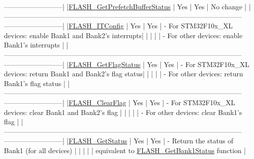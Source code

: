 \begin{DoxyCode}
      --------------------------|
  |\hyperlink{group___f_l_a_s_h___exported___functions_ga289bffe7f078d6a130222f03c59bc235}{FLASH\_GetPrefetchBufferStatus}       |    Yes     |      Yes      | No 
      change                                                      |
  |--------------------------------------------------------------------------------------------------------
      --------------------------|
  |\hyperlink{group___f_l_a_s_h___exported___functions_ga94c1e51a9c3bf8d48eb6eb4a4d054861}{FLASH\_ITConfig}                      |    Yes     |      Yes      | - For STM32F10x\_XL 
      devices: enable Bank1 and Bank2\textcolor{stringliteral}{'s interrupts|}
\textcolor{stringliteral}{  |                                    |            |               | - For other devices: enable Bank1'}s 
      interrupts                 |
  |--------------------------------------------------------------------------------------------------------
      --------------------------|
  |\hyperlink{group___f_l_a_s_h___exported___functions_gae3fb545e32f21501ca27d4380e0f2088}{FLASH\_GetFlagStatus}                 |    Yes     |      Yes      | - For STM32F10x\_XL
       devices: \textcolor{keywordflow}{return} Bank1 and Bank2\textcolor{stringliteral}{'s flag status|}
\textcolor{stringliteral}{  |                                    |            |               | - For other devices: return Bank1'}s 
      flag status                |
  |--------------------------------------------------------------------------------------------------------
      --------------------------|
  |\hyperlink{group___f_l_a_s_h___exported___functions_gac4be1d486483fa5cd70ec77d44ca8f87}{FLASH\_ClearFlag}                     |    Yes     |      Yes      | - For STM32F10x\_XL 
      devices: clear Bank1 and Bank2\textcolor{stringliteral}{'s flag       |}
\textcolor{stringliteral}{  |                                    |            |               | - For other devices: clear Bank1'}s 
      flag                        |
  |--------------------------------------------------------------------------------------------------------
      --------------------------|
  |\hyperlink{group___f_l_a_s_h___exported___functions_gac265b8d1e7ea11e44ceee28797c3debb}{FLASH\_GetStatus}                     |    Yes     |      Yes      | - Return the status of
       Bank1 (\textcolor{keywordflow}{for} all devices)                 |
  |                                    |            |               |   equivalent to 
      \hyperlink{group___f_l_a_s_h___exported___functions_ga9d5b76b75ef4c578cc45dc836a1929b6}{FLASH\_GetBank1Status} \textcolor{keyword}{function}                  |

\end{DoxyCode}
